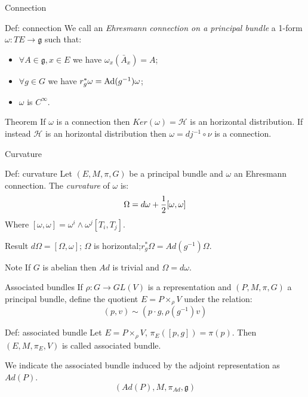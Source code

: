 \documentclass{beamer}
\begin{document}
\begin{frame}{Connection}
	\begin{exampleblock}{Def: connection}
			We call an \textit{Ehresmann connection on a principal bundle} a 1-form $\omega:TE\rightarrow \mathfrak{g}$ such that:
		\begin{itemize}
			\item $\forall A\in\mathfrak{g}, x\in E$ we have $\omega_{x}(\bar{A}_{x})=A$;
			\item $\forall g\in G$ we have $r^*_g\omega=\hbox{Ad}(g^{-1})\omega$;
			\item $\omega$ is $C^\infty$.
		\end{itemize}
	\end{exampleblock}
	\begin{alertblock}{Theorem}
		If $\omega$ is a connection then $Ker(\omega)=\mathcal{H}$ is an horizontal distribution. If instead $\mathcal{H}$ is an horizontal distribution then $\omega=dj^{-1}\circ \nu$ is a connection.
	\end{alertblock}
\end{frame}
\begin{frame}{Curvature}
	\begin{exampleblock}{Def: curvature}
		Let $(E,M,\pi,G)$ be a principal bundle and $\omega$ an Ehresmann connection. The \textit{curvature} of $\omega$ is:
		$$\Omega=d\omega+{1\over 2}[\omega,\omega]$$
		Where $[\omega,\omega]=\omega^i\wedge\omega^j[T_i,T_j]$.
	\end{exampleblock}
	\begin{block}{Result}
		$d\Omega=[\Omega,\omega]$; $\Omega$ is horizontal;$r^*_g\Omega=Ad(g^{-1})\Omega$.
	\end{block}		
	\begin{alertblock}{Note}
		If $G$ is abelian then $Ad$ is trivial and $\Omega=d\omega$.
	\end{alertblock}
\end{frame}
\begin{frame}{Associated bundles}
	If $\rho:G\rightarrow GL(V)$ is a representation and $(P,M,\pi,G)$ a principal bundle, define the quotient $E=P\times_\rho V$
	under the relation:
	$$(p,v)\sim(p\cdot g, \rho(g^{-1})v)$$
	\begin{exampleblock}{Def: associated bundle}
			Let $E=P\times_\rho V$, $\pi_E([p,g])=\pi(p)$. Then  $(E,M,\pi_E,V)$ is called associated bundle.
	\end{exampleblock}
		We indicate the associated bundle induced by the adjoint representation as $Ad(P)$.
		$$(Ad(P),M,\pi_{Ad},\mathfrak{g})$$
\end{frame}
\end{document}
